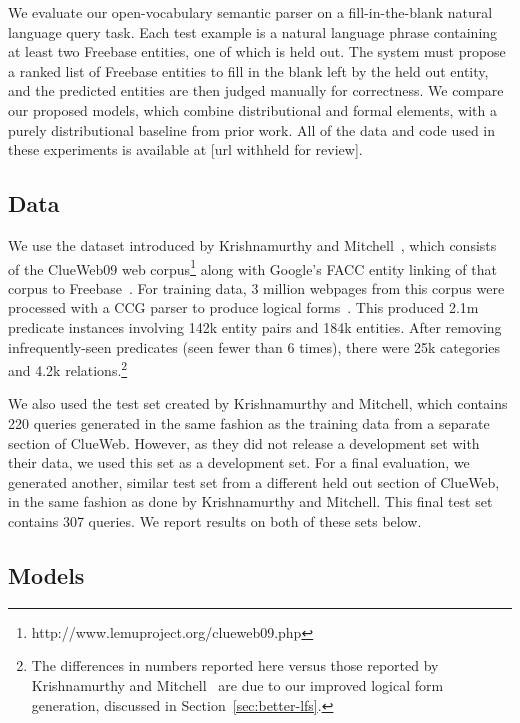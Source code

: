 \documentclass[11pt,letterpaper]{article}
\newcommand{\secref}[1]{Section~\ref{sec:#1}}
\begin{document}
We evaluate our open-vocabulary semantic parser on a fill-in-the-blank natural
language query task.  Each test example is a natural language phrase containing
at least two Freebase entities, one of which is held out.  The system must
propose a ranked list of Freebase entities to fill in the blank left by the
held out entity, and the predicted entities are then judged manually for
correctness.  We compare our proposed models, which combine distributional and
formal elements, with a purely distributional baseline from prior work.  All of
the data and code used in these experiments is available at [url withheld for
review].

\subsection{Data}

We use the dataset introduced by Krishnamurthy and
Mitchell~, which
consists of the ClueWeb09 web
corpus\footnote{http://www.lemuproject.org/clueweb09.php} along with Google's
FACC entity linking of that corpus to
Freebase~\cite{gabrilovich-2013-clueweb-entity-linking}.  For training data, 3
million webpages from this corpus were processed with a CCG parser to produce
logical forms~\cite{krishnamurthy-2014-joint-ccg}.  This produced 2.1m
predicate instances involving 142k entity pairs and 184k entities.  After
removing infrequently-seen predicates (seen fewer than 6 times), there were 25k
categories and 4.2k relations.\footnote{The differences in numbers reported
here versus those reported by Krishnamurthy and
Mitchell~ are due to our
improved logical form generation, discussed in \secref{better-lfs}.}

We also used the test set created by Krishnamurthy and Mitchell, which contains
220 queries generated in the same fashion as the training data from a separate
section of ClueWeb.  However, as they did not release a development set with
their data, we used this set as a development set.  For a final evaluation, we
generated another, similar test set from a different held out section of
ClueWeb, in the same fashion as done by Krishnamurthy and Mitchell.  This final
test set contains 307 queries.  We report results on both of these sets below.

\subsection{Models}
\end{document}
